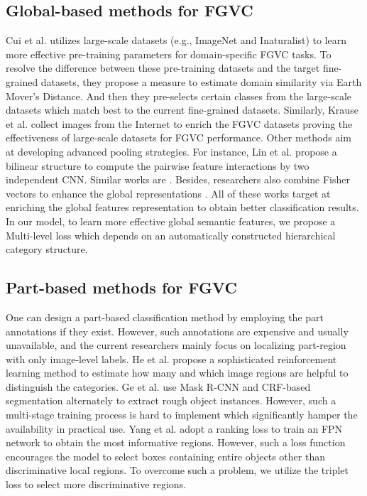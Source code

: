 \documentclass[10pt,twocolumn,letterpaper]{article}
\begin{document}
\subsection{Global-based methods for FGVC}
Cui et al.\cite{cui2018large} utilizes large-scale datasets (e.g., ImageNet\cite{deng2009imagenet} and Inaturalist\cite{van2015building}) to learn more effective pre-training parameters for domain-specific FGVC tasks. To resolve the difference between these pre-training datasets and the target fine-grained datasets, they propose a measure to estimate domain similarity via Earth Mover’s Distance. And then they pre-selects certain classes from the large-scale datasets which match best to the current fine-grained datasets. Similarly, Krause et al.\cite{KrauseSHZTDPF16} collect images from the Internet to enrich the FGVC datasets proving the effectiveness of large-scale datasets for FGVC performance.
Other methods aim at developing advanced pooling strategies. For instance, Lin et al.\cite{LinRM15} propose a bilinear structure to compute the pairwise feature interactions by two independent CNN. Similar works are \cite{SimonGDDR17,SimonRDD20,ZhengFZL19}. Besides, researchers also combine Fisher vectors to enhance the global representations \cite{abs-2007-02080,ZhangXZLT16}. All of these works target at enriching the global features representation to obtain better classification results. 
In our model, to learn more effective global semantic features, we propose a Multi-level loss which depends on an automatically constructed hierarchical category structure.
\subsection{Part-based methods for FGVC}
One can design a part-based classification method by employing the part annotations if they exist. However, such annotations are expensive and usually unavailable, and the current researchers mainly focus on localizing part-region with only image-level labels\cite{BencyKLKM16,KimCY17,SinghL17,OquabBLS15,ZhouKLOT16,zhangWF0H18,WangWYLLL20}. He et al.\cite{he2019and} propose a sophisticated reinforcement learning method to estimate how many and which image regions are helpful to distinguish the categories. Ge et al.\cite{GeLY19} use Mask R-CNN and CRF-based segmentation alternately to extract rough object instances. However, such a multi-stage training process is hard to implement which significantly hamper the availability in practical use. Yang et al.\cite{YangLWHGW18} adopt a ranking loss to train an FPN network to obtain the most informative regions. However, such a loss function encourages the model to select boxes containing entire objects other than discriminative local regions. To overcome such a problem, we utilize the triplet loss to select more discriminative regions.
\end{document}
